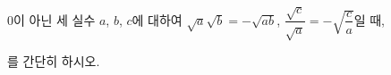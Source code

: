 $0$이 아닌 세 실수 $a$, $b$, $c$에 대하여 $\sqrt{a}\sqrt{b}=-\sqrt{ab}$, $\dfrac{\sqrt{c}}{\sqrt{a}}=-\sqrt{\dfrac{c}{a}}$일 때,\par\smallskip{}\par\smallskip\noindent 를 간단히 하시오.
